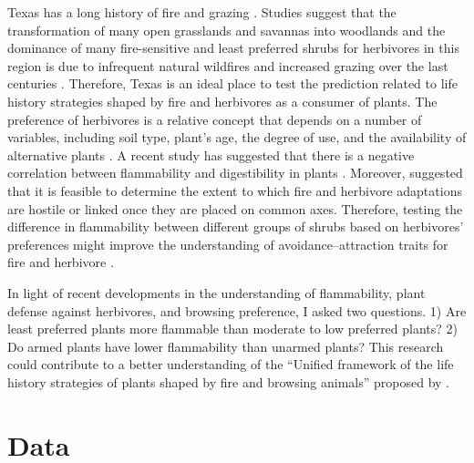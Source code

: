 \documentclass{ttuthes2007}
\begin{document}
Texas has a long history of fire \citep{moir1982firehistory, stambaugh2011firehistory,stambaugh2014historicalfirehistory,smeins2005historyoffire1} and grazing \citep{buechner1950lifegrazing, wilcox2012historicalgrazing2}. Studies suggest that the transformation of many open grasslands and savannas into woodlands and the dominance of many fire-sensitive and least preferred shrubs for herbivores in this region is due to infrequent natural wildfires and increased grazing over the last centuries \citep{archer1989havejoint,andruk2014joint, masters1986prescribed}. Therefore, Texas is an ideal place to test the prediction related to life history strategies shaped by fire and herbivores as a consumer of plants. The preference of herbivores is a relative concept that depends on a number of variables, including soil type, plant's age, the degree of use, and the availability of alternative plants \citep{wright2003white}.  A recent study has suggested that there is a negative correlation between flammability and digestibility in plants \citep{gowda2022digestibility}. Moreover, \citep{archibald2019unified} suggested that it is feasible to determine the extent to which fire and herbivore adaptations are hostile or linked once they are placed on common axes. Therefore, testing the difference in flammability between different groups of shrubs based on herbivores' preferences might improve the understanding of avoidance–attraction traits for fire and herbivore \citep{schwilk2003flammability, archibald2019unified}. 

In light of recent developments in the understanding of flammability, plant defense against herbivores, and browsing preference, I asked two questions. 1) Are least preferred plants more flammable than moderate to low preferred plants?  2) Do armed plants have lower flammability than unarmed plants? This research could contribute to a better understanding of the ``Unified framework of the life history strategies of plants shaped by fire and browsing animals'' proposed by \citep{archibald2019unified}.


\section{Data}
\end{document}
